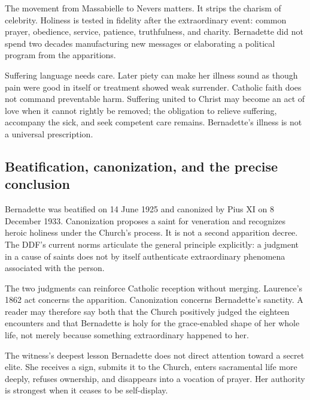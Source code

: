 The movement from Massabielle to Nevers matters. It strips the charism of celebrity. Holiness is tested in fidelity after the extraordinary event: common prayer, obedience, service, patience, truthfulness, and charity. Bernadette did not spend two decades manufacturing new messages or elaborating a political program from the apparitions.

Suffering language needs care. Later piety can make her illness sound as though pain were good in itself or treatment showed weak surrender. Catholic faith does not command preventable harm. Suffering united to Christ may become an act of love when it cannot rightly be removed; the obligation to relieve suffering, accompany the sick, and seek competent care remains. Bernadette's illness is not a universal prescription.

\subsection{Beatification, canonization, and the precise conclusion}

Bernadette was beatified on 14 June 1925 and canonized by Pius XI on 8 December 1933. Canonization proposes a saint for veneration and recognizes heroic holiness under the Church's process. It is not a second apparition decree. The DDF's current norms articulate the general principle explicitly: a judgment in a cause of saints does not by itself authenticate extraordinary phenomena associated with the person.

The two judgments can reinforce Catholic reception without merging. Laurence's 1862 act concerns the apparition. Canonization concerns Bernadette's sanctity. A reader may therefore say both that the Church positively judged the eighteen encounters and that Bernadette is holy for the grace-enabled shape of her whole life, not merely because something extraordinary happened to her.

\begin{studybox}{The witness's deepest lesson}
Bernadette does not direct attention toward a secret elite. She receives a sign, submits it to the Church, enters sacramental life more deeply, refuses ownership, and disappears into a vocation of prayer. Her authority is strongest when it ceases to be self-display.
\end{studybox}
